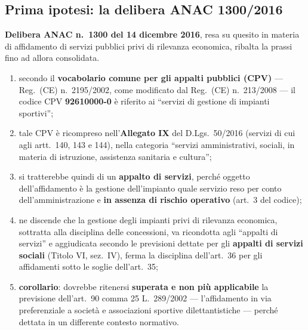 \subsection{Prima ipotesi: la delibera ANAC 1300/2016}

\textbf{Delibera ANAC n.\ 1300 del 14 dicembre 2016}, resa su quesito in materia di affidamento di
servizi pubblici privi di rilevanza economica, ribalta la prassi fino ad allora consolidata.

\begin{enumerate}
  \item secondo il \textbf{vocabolario comune per gli appalti pubblici (CPV)} --- Reg.\ (CE)
    n.\ 2195/2002, come modificato dal Reg.\ (CE) n.\ 213/2008 --- il codice CPV
    \textbf{92610000-0} è riferito ai ``servizi di gestione di impianti sportivi'';
  \item tale CPV è ricompreso nell'\textbf{Allegato IX} del D.Lgs.\ 50/2016 (servizi di cui agli
    artt.\ 140, 143 e 144), nella categoria ``servizi amministrativi, sociali, in materia di
    istruzione, assistenza sanitaria e cultura'';
  \item si tratterebbe quindi di un \textbf{appalto di servizi}, perché oggetto dell'affidamento è
    la gestione dell'impianto quale servizio reso per conto dell'amministrazione e \textbf{in
    assenza di rischio operativo} (art.\ 3 del codice);
  \item ne discende che la gestione degli impianti privi di rilevanza economica, sottratta alla
    disciplina delle concessioni, va ricondotta agli ``appalti di servizi'' e aggiudicata secondo
    le previsioni dettate per gli \textbf{appalti di servizi sociali} (Titolo VI, sez.\ IV), ferma
    la disciplina dell'art.\ 36 per gli affidamenti sotto le soglie dell'art.\ 35;
  \item \textbf{corollario}: dovrebbe ritenersi \textbf{superata e non più applicabile} la
    previsione dell'art.\ 90 comma 25 L.\ 289/2002 --- l'affidamento in via preferenziale a
    società e associazioni sportive dilettantistiche --- perché dettata in un differente contesto
    normativo.
\end{enumerate}


